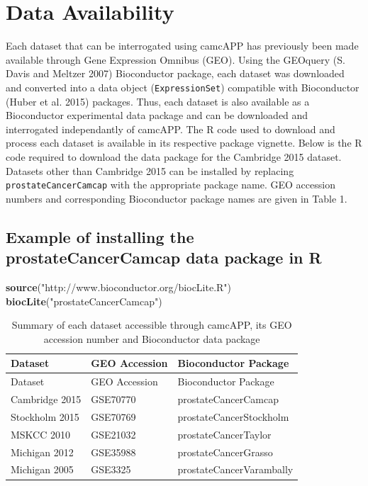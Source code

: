 \documentclass[]{article}
\newenvironment{Shaded}{\begin{snugshade}}{\end{snugshade}}
\newcommand{\KeywordTok}[1]{\textcolor[rgb]{0.13,0.29,0.53}{\textbf{{#1}}}}
\newcommand{\StringTok}[1]{\textcolor[rgb]{0.31,0.60,0.02}{{#1}}}
\newcommand{\NormalTok}[1]{{#1}}
\begin{document}
\section{Data Availability}\label{data-availability}

Each dataset that can be interrogated using camcAPP has previously been
made available through Gene Expression Omnibus (GEO). Using the GEOquery
(S. Davis and Meltzer 2007) Bioconductor package, each dataset was
downloaded and converted into a data object (\texttt{ExpressionSet})
compatible with Bioconductor (Huber et al. 2015) packages. Thus, each
dataset is also available as a Bioconductor experimental data package
and can be downloaded and interrogated independantly of camcAPP. The R
code used to download and process each dataset is available in its
respective package vignette. Below is the R code required to download
the data package for the Cambridge 2015 dataset. Datasets other than
Cambridge 2015 can be installed by replacing
\texttt{prostateCancerCamcap} with the appropriate package name. GEO
accession numbers and corresponding Bioconductor package names are given
in Table 1.

\subsection{Example of installing the prostateCancerCamcap data package
in
R}\label{example-of-installing-the-prostatecancercamcap-data-package-in-r}

\begin{Shaded}
\begin{Highlighting}[]
\KeywordTok{source}\NormalTok{(}\StringTok{"http://www.bioconductor.org/biocLite.R"}\NormalTok{)}
\KeywordTok{biocLite}\NormalTok{(}\StringTok{"prostateCancerCamcap"}\NormalTok{)}
\end{Highlighting}
\end{Shaded}

\begin{longtable}[]{@{}lll@{}}
\caption{Summary of each dataset accessible through camcAPP, its GEO
accession number and Bioconductor data package}\tabularnewline
\toprule
Dataset & GEO Accession & Bioconductor Package\tabularnewline
\midrule
\endfirsthead
\toprule
Dataset & GEO Accession & Bioconductor Package\tabularnewline
\midrule
\endhead
Cambridge 2015 & GSE70770 & prostateCancerCamcap\tabularnewline
Stockholm 2015 & GSE70769 & prostateCancerStockholm\tabularnewline
MSKCC 2010 & GSE21032 & prostateCancerTaylor\tabularnewline
Michigan 2012 & GSE35988 & prostateCancerGrasso\tabularnewline
Michigan 2005 & GSE3325 & prostateCancerVarambally\tabularnewline
\bottomrule
\end{longtable}
\end{document}
